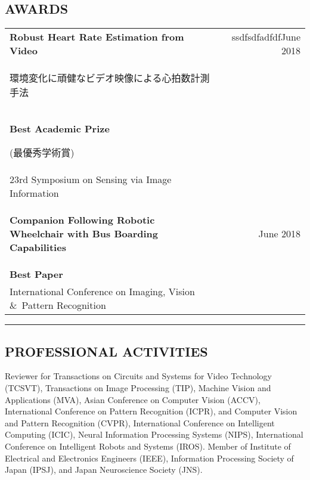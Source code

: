 \documentclass[letterpaper,10pt]{article}
\newcommand{\myline}{ \rule{\textwidth}{0.01in} }
\begin{document}
\subsection*{AWARDS}
\begin{tabularx}{\textwidth}{b{}r}
\bfseries{Robust Heart Rate Estimation from Video} & {\textcolor[rgb]{1,1,1}{ssdfsdfadfdf}June 2018} \\
{\begin{CJK}{UTF8}{min}\begin{small}環境変化に頑健なビデオ映像による心拍数計測手法\end{small}\end{CJK}} & {} \\
\textbf{Best Academic Prize} \begin{CJK}{UTF8}{min}(最優秀学術賞)\end{CJK} & {} \\
        {23rd Symposium on Sensing via Image Information} & {} \\ \vspace{0.05in}
\bfseries{\begin{small}\textbf{Companion Following Robotic Wheelchair with Bus Boarding Capabilities}\end{small}} & {June 2018} \\
\textbf{Best Paper}& {} \\
        {International Conference on Imaging, Vision \&\ Pattern Recognition} & {} \vspace{0.05in} \\
\end{tabularx}

\myline

\subsection*{PROFESSIONAL ACTIVITIES}
Reviewer for Transactions on Circuits and Systems for Video Technology (TCSVT), Transactions on Image Processing (TIP), Machine Vision and Applications (MVA), Asian Conference on Computer Vision (ACCV), International Conference on Pattern Recognition (ICPR), and Computer Vision and Pattern Recognition (CVPR), International Conference on Intelligent Computing (ICIC), Neural Information Processing Systems (NIPS), International Conference on Intelligent Robots and Systems (IROS).
Member of Institute of Electrical and Electronics Engineers (IEEE), Information Processing Society of Japan (IPSJ),  and Japan Neuroscience Society (JNS).
\end{document}
